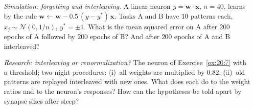 \begin{exercise}[\lvlB]
\label{ex:20:7}
\emph{Simulation: forgetting and interleaving.} A linear neuron $y=\mathbf w\cdot\mathbf x$, $n=40$, learns by the rule $\mathbf w\leftarrow\mathbf w-0.5\,(y-y^*)\,\mathbf x$. Tasks A and B have $10$ patterns each, $x_j\sim\mathcal N(0,1/n)$, $y^*=\pm1$. What is the mean squared error on A after $200$ epochs of A followed by $200$ epochs of B? And after $200$ epochs of A and B interleaved?
\end{exercise}

\begin{exercise}[\lvlC]
\label{ex:20:8}
\emph{Research: interleaving or renormalization?} The neuron of Exercise~\ref{ex:20:7} with a threshold; two night procedures: (i)~all weights are multiplied by $0.82$; (ii)~old patterns are replayed interleaved with new ones. What does each do to the weight ratios and to the neuron's responses? How can the hypotheses be told apart by synapse sizes after sleep?
\end{exercise}
